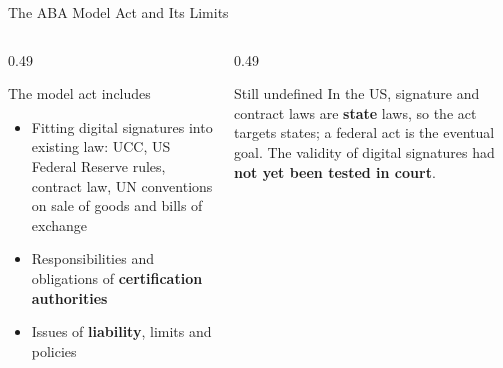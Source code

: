 \documentclass[aspectratio=169,11pt,xcolor={table}]{beamer}
\begin{document}
\begin{frame}{The ABA Model Act and Its Limits}
  \begin{columns}[T]
    \begin{column}{0.49\textwidth}
      \begin{block}{The model act includes}
        \small
        \begin{itemize}\setlength{\itemsep}{2pt}
          \item Fitting digital signatures into existing law: UCC, US Federal Reserve rules, contract law, UN conventions on sale of goods and bills of exchange
          \item Responsibilities and obligations of \textbf{certification authorities}
          \item Issues of \textbf{liability}, limits and policies
        \end{itemize}
      \end{block}
    \end{column}
    \begin{column}{0.49\textwidth}
      \begin{alertblock}{Still undefined}
        \small In the US, signature and contract laws are \textbf{state} laws, so the act targets states; a federal act is the eventual goal. The validity of digital signatures had \textbf{not yet been tested in court}.
      \end{alertblock}
      \centering
    \end{column}
  \end{columns}
\end{frame}
\end{document}
